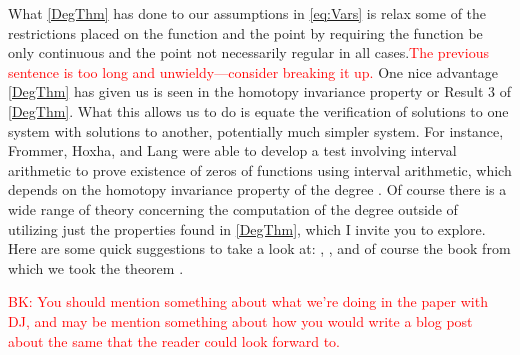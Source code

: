 \documentclass[11pt]{article}
\theoremstyle{plain}
\theoremstyle{definition}
\theoremstyle{remark}
\newcommand{\delete}[1]{\textcolor{red}{#1}}
\newcommand{\modified}[1]{\textcolor{darkgrn}{#1}}
\begin{document}
What \cref{DegThm} has done to our assumptions in \eqref{eq:Vars} is relax some of \modified{the} restrictions placed on the function and the point by requiring the function be \modified{only} continuous and the point not necessarily regular in all cases.\delete{The previous sentence is too long and unwieldy---consider breaking it up.}
One nice advantage \cref{DegThm} has given us is seen in the homotopy invariance property or \modified{Result} 3 of \cref{DegThm}.
What this allows us to do is equate the verification of solutions to one system with solutions to another, potentially much simpler system.
For instance, Frommer, Hoxha, and Lang were able to develop a test involving interval arithmetic to prove existence of zeros of functions using interval arithmetic, which depends on the homotopy invariance property of the degree \cite{FrHoLa2007}.
Of course there is a wide range of theory concerning the computation of the degree outside of utilizing just the properties found in \cref{DegThm}, which I invite you to explore.
Here are some quick suggestions to take a look at: \cite{MoVrYa2002}, \cite{OnTh2006}, and of course the book from which we took the theorem \cite{OrChCh2006}.


\delete{BK: You should mention something about what we're doing in the paper with DJ, and may be mention something about how you would write a blog post about the same that the reader could look forward to.}
  

\end{document}
